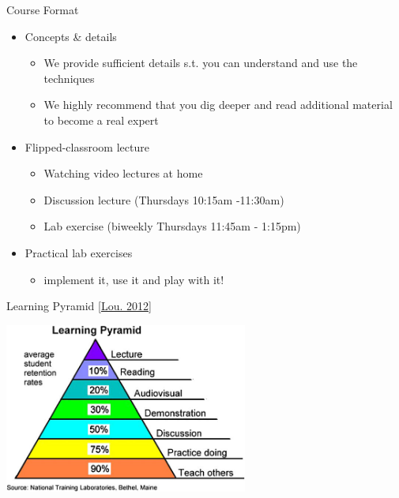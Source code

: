 \documentclass[aspectratio=169,handout]{../latex_main/tntbeamer}  %
\begin{document}
\begin{frame}[c]{Course Format}

\begin{itemize}
	\item Concepts \& details
	\begin{itemize}
	  \item We provide sufficient details s.t. you can understand and use the techniques
	  \item We highly recommend that you dig deeper and read additional material to become a real expert
	\end{itemize}
	\smallskip
	\item Flipped-classroom lecture
	\begin{itemize}
        \item Watching video lectures at home
	  \item Discussion lecture (Thursdays \alert{10:15am -11:30am})
        \item Lab exercise (biweekly Thursdays 11:45am - 1:15pm)
	\end{itemize}
	\smallskip
	\item Practical lab exercises
	\begin{itemize}
	  \item implement it, use it and play with it!
	\end{itemize}
\end{itemize}

\end{frame}
\begin{frame}[c]{Learning Pyramid [\href{https://www.researchgate.net/publication/221801860_Applying_principles_from_Scientific_Foundations_for_Future_Physicians_to_teaching_chemistry_in_the_department_of_medicine_at_Chang_Gung_University}{Lou. 2012}]}

\centering
\includegraphics[width=0.6\textwidth]{figures/The-learning-pyramid-from-NTL-Institute-for-Applied-Behavioral-Science.jpg}

\end{frame}
\end{document}
